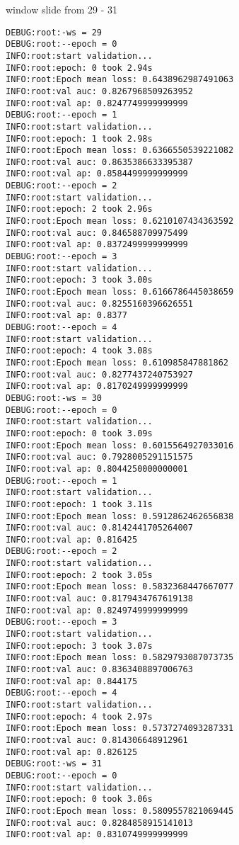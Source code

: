\documentclass[11pt]{article}
\begin{document}
window slide from 29 - 31
\begin{verbatim}
DEBUG:root:-ws = 29
DEBUG:root:--epoch = 0
INFO:root:start validation...
INFO:root:epoch: 0 took 2.94s
INFO:root:Epoch mean loss: 0.6438962987491063
INFO:root:val auc: 0.8267968509263952
INFO:root:val ap: 0.8247749999999999
DEBUG:root:--epoch = 1
INFO:root:start validation...
INFO:root:epoch: 1 took 2.98s
INFO:root:Epoch mean loss: 0.6366550539221082
INFO:root:val auc: 0.8635386633395387
INFO:root:val ap: 0.8584499999999999
DEBUG:root:--epoch = 2
INFO:root:start validation...
INFO:root:epoch: 2 took 2.96s
INFO:root:Epoch mean loss: 0.6210107434363592
INFO:root:val auc: 0.846588709975499
INFO:root:val ap: 0.8372499999999999
DEBUG:root:--epoch = 3
INFO:root:start validation...
INFO:root:epoch: 3 took 3.00s
INFO:root:Epoch mean loss: 0.6166786445038659
INFO:root:val auc: 0.8255160396626551
INFO:root:val ap: 0.8377
DEBUG:root:--epoch = 4
INFO:root:start validation...
INFO:root:epoch: 4 took 3.08s
INFO:root:Epoch mean loss: 0.610985847881862
INFO:root:val auc: 0.8277437240753927
INFO:root:val ap: 0.8170249999999999
DEBUG:root:-ws = 30
DEBUG:root:--epoch = 0
INFO:root:start validation...
INFO:root:epoch: 0 took 3.09s
INFO:root:Epoch mean loss: 0.6015564927033016
INFO:root:val auc: 0.7928005291151575
INFO:root:val ap: 0.8044250000000001
DEBUG:root:--epoch = 1
INFO:root:start validation...
INFO:root:epoch: 1 took 3.11s
INFO:root:Epoch mean loss: 0.5912862462656838
INFO:root:val auc: 0.8142441705264007
INFO:root:val ap: 0.816425
DEBUG:root:--epoch = 2
INFO:root:start validation...
INFO:root:epoch: 2 took 3.05s
INFO:root:Epoch mean loss: 0.5832368447667077
INFO:root:val auc: 0.8179434767619138
INFO:root:val ap: 0.8249749999999999
DEBUG:root:--epoch = 3
INFO:root:start validation...
INFO:root:epoch: 3 took 3.07s
INFO:root:Epoch mean loss: 0.5829793087073735
INFO:root:val auc: 0.8363408897006763
INFO:root:val ap: 0.844175
DEBUG:root:--epoch = 4
INFO:root:start validation...
INFO:root:epoch: 4 took 2.97s
INFO:root:Epoch mean loss: 0.5737274093287331
INFO:root:val auc: 0.814306648912961
INFO:root:val ap: 0.826125
DEBUG:root:-ws = 31
DEBUG:root:--epoch = 0
INFO:root:start validation...
INFO:root:epoch: 0 took 3.06s
INFO:root:Epoch mean loss: 0.5809557821069445
INFO:root:val auc: 0.8284858915141013
INFO:root:val ap: 0.8310749999999999
\end{verbatim}
\end{document}
